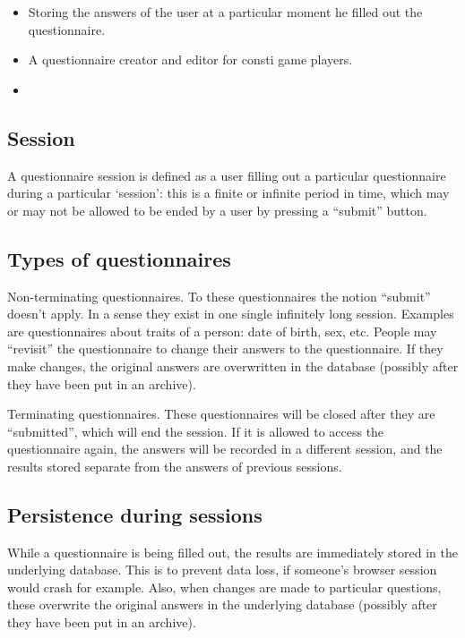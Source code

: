 \documentclass{article}
\begin{document}
\begin{itemize}
   \item Storing the answers of the user at a particular moment he filled out the questionnaire.
   \item A questionnaire creator and editor for consti game players.
   \item 
\end{itemize}

\subsection{Session}

A questionnaire session is defined as a user filling out a particular questionnaire during a particular `session': this is a finite or infinite period in time, which may or may not be allowed to be ended by a user by pressing a ``submit'' button.

\subsection{Types of questionnaires}

Non-terminating questionnaires. To these questionnaires the notion ``submit'' doesn't apply. In a sense they exist in one single infinitely long session. Examples are questionnaires about traits of a person: date of birth, sex, etc. People may ``revisit'' the questionnaire to change their answers to the questionnaire. If they make changes, the original answers are overwritten in the database (possibly after they have been put in an archive).

Terminating questionnaires. These questionnaires will be closed after they are ``submitted'', which will end the session. If it is allowed to access the questionnaire again, the answers will be recorded in a different session, and the results stored separate from the answers of previous sessions.

\subsection{Persistence during sessions}

While a questionnaire is being filled out, the results are immediately stored in the underlying database. This is to prevent data loss, if someone's browser session would crash for example. Also, when changes are made to particular questions, these overwrite the original answers in the underlying database (possibly after they have been put in an archive).
\end{document}
